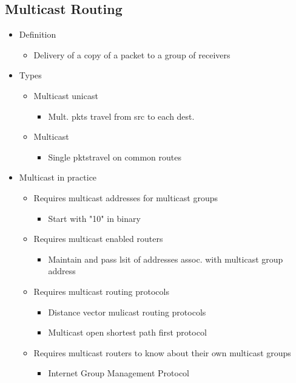 \subsection{Multicast Routing}
\begin{itemize}
	\item Definition
	\begin{itemize}
		\item Delivery of a copy of a packet to a group of receivers
	\end{itemize}
	\item Types
	\begin{itemize}
		\item Multicast unicast
		\begin{itemize}
			\item Mult. pkts travel from src to each dest.
		\end{itemize}
		\item Multicast
		\begin{itemize}
			\item Single pktstravel on common routes
		\end{itemize}
	\end{itemize}
	\item Multicast in practice
	\begin{itemize}
		\item Requires multicast addresses for multicast groups
		\begin{itemize}
			\item Start with "10" in binary
		\end{itemize}
		\item Requires multicast enabled routers
		\begin{itemize}
			\item Maintain and pass lsit of addresses assoc. with
				multicast group address
		\end{itemize}
		\item Requires multicast routing protocols
		\begin{itemize}
			\item Distance vector mulicast routing protocols
			\item Multicast open shortest path first protocol
		\end{itemize}
		\item Requires multicast routers to know about their own
			multicast groups
		\begin{itemize}
			\item Internet Group Management Protocol
		\end{itemize}
	\end{itemize}
\end{itemize}
